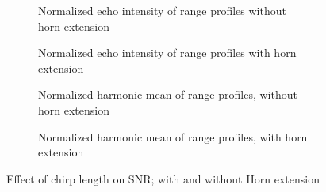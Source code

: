 \begin{figure}[htbp]
    \centering
    \begin{subfigure}{0.475 \textwidth}
        \centering
        \def\svgwidth{\linewidth} \small
        
        \caption{Normalized echo intensity of range profiles without horn extension}
        \bigskip
    \end{subfigure}
    \hfill
    \begin{subfigure}{0.475 \textwidth}
        \centering
        \def\svgwidth{\linewidth} \small
        
        \caption{Normalized echo intensity of range profiles with horn extension}
        \bigskip
    \end{subfigure}
    \begin{subfigure}{0.475 \textwidth}
        \centering
        \def\svgwidth{\linewidth} \small
        
        \caption{Normalized harmonic mean of range profiles, without horn extension}
    \end{subfigure}
    \hfill
    \begin{subfigure}{0.475 \textwidth}
        \centering
        \def\svgwidth{\linewidth} \small
        
        \caption{Normalized harmonic mean of range profiles, with horn extension}
    \end{subfigure}
    \caption{Effect of chirp length on SNR; with and without Horn extension}
    \label{fig:fig_compare_chirp_times}
\end{figure}
